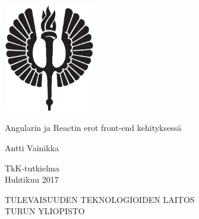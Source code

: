 \documentclass[a4paper,12pt,twoside]{article} %
\begin{document}
\pagestyle{empty}  %

\begin{center}
\includegraphics[width=4cm]{soihtu.eps} %
\end{center}

\vspace{3.0cm}
\begin{center}\large
Angularin ja Reactin erot front-end kehityksessä
\end{center}

\vspace{0.5cm}
\begin{center}
Antti Vainikka
\end{center}

\vspace{0.5cm}
\begin{center}
TkK-tutkielma\\
Huhtikuu 2017
\end{center}

\vspace{5.0cm}
\begin{center}
TULEVAISUUDEN TEKNOLOGIOIDEN LAITOS\\
TURUN YLIOPISTO\\
\end{center}

\addtolength{\oddsidemargin}{-1.1cm}
\addtolength{\voffset}{-2.3cm}
\end{document}
